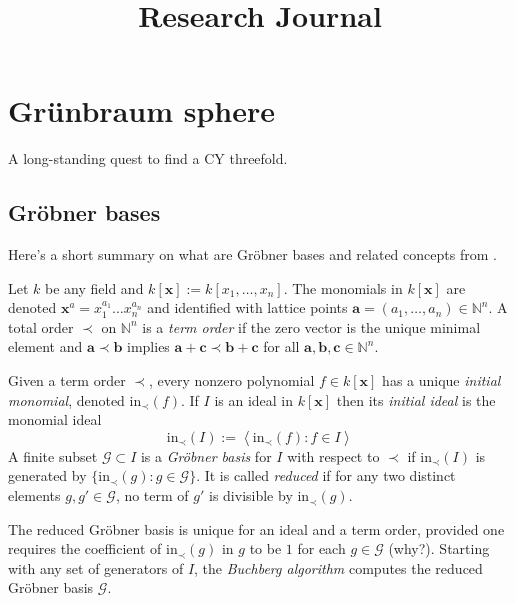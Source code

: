 



\title{Research Journal}
\maketitle

\label{section-phantom}

\tableofcontents

\section{Grünbraum sphere}
\label{section-Grunbaum-sphere}

A long-standing quest to find a CY threefold.

\subsection{Gröbner bases}
\label{subsection-Grobner-bases}

Here's a short summary on what are Gröbner bases and related concepts from
\cite{sturmfelds-groebner}.

Let $k$ be any field and $k[\mathbf{x}]:=k[x_1,\ldots,x_n]$. The monomials in
$k[\mathbf{x}]$ are denoted $\mathbf{x}^a=x_1^{a_1}\ldots x_n^{a_n}$ and
identified with lattice points $\mathbf{a}=(a_1,\ldots,a_n)\in \mathbb{N}^n$. A
total order $\prec$ on $\mathbb{N}^n$ is a {\it term order} if the zero vector
is the unique minimal element and $\mathbf{a}\prec \mathbf{b}$ implies
$\mathbf{a}+\mathbf{c}\prec\mathbf{b}+\mathbf{c}$ for all
$\mathbf{a},\mathbf{b},\mathbf{c}\in \mathbb{N}^n$.

Given a term order $\prec$, every nonzero polynomial $f\in k[\mathbf{x}]$ has a
unique {\it initial monomial}, denoted $\text{in}_{\prec}(f)$. If $I$ is an
ideal in $k[\mathbf{x}]$ then its {\it initial ideal} is the monomial ideal
$$
\text{in}_{\prec}(I):=\left<\text{in}_{\prec}(f):f \in I\right>
$$
A finite subset $\mathcal{G} \subset I$ is a {\it Gröbner basis} for $I$ with
respect to $\prec$ if $\text{in}_{\prec}(I)$ is generated by
$\{\text{in}_{\prec}(g):g \in \mathcal{G}\}$. It is called {\it reduced} if for
any two distinct elements $g,g'\in\mathcal{G}$, no term of $g'$ is divisible by
$\text{in}_{\prec}(g)$. 

The reduced Gröbner basis is unique for an ideal and a
term order, provided one requires the coefficient of $\text{in}_{\prec}(g)$ in
$g$ to be $1$ for each $g \in \mathcal{G}$ (why?). Starting with any set of
generators of $I$, the {\it Buchberg algorithm} computes the reduced Gröbner
basis $\mathcal{G}$.

